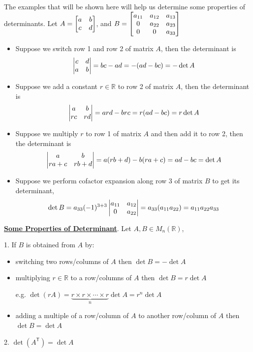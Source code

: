 \begin{example}
The examples that will be shown here will help us determine some properties of determinants. Let $\displaystyle A = \begin{bmatrix} 
a & b \\
c & d
 \end{bmatrix}$, and $\displaystyle B = \begin{bmatrix} 
a_{11} & a_{12} & a_{13} \\
0 & a_{22} & a_{23} \\
0 & 0 & a_{33}
 \end{bmatrix}$
\begin{itemize}
    \item Suppose we switch row 1 and row 2 of matrix $A$, then the determinant is
    $$\begin{vmatrix} 
    c & d \\
    a & b
     \end{vmatrix} = bc - ad = -(ad -bc) = -\det A$$
    \item Suppose we add a constant $r \in \mathbb{R}$ to row 2 of matrix $A$, then the determinant is
    $$\begin{vmatrix} 
    a & b\\
    rc & rd
     \end{vmatrix} = ard - brc = r(ad - bc) = r\det A$$
    \item Suppose we multiply $r$ to row 1 of matrix $A$ and then add it to row 2, then the determinant is
    $$\begin{vmatrix} 
    a & b\\
    ra + c & rb + d
     \end{vmatrix} = a(rb + d) - b(ra + c) = ad - bc = \det A$$
    \item Suppose we perform cofactor expansion along row 3 of matrix $B$ to get its determinant,
    $$\det B = a_{33}(-1)^{3 + 3}\begin{vmatrix} 
    a_{11} & a_{12} \\
    0 & a_{22}
     \end{vmatrix} = a_{33}(a_{11}a_{22}) = a_{11}a_{22}a_{33}$$
\end{itemize}
\end{example}

\lline

\underline{\textbf{Some Properties of Determinant}}. Let $A, B \in M_n(\mathbb{R})$,

1. If $B$ is obtained from $A$ by:
\begin{itemize}
    \item switching two rows/columns of $A$ then $\det B = -\det A$
    \item multiplying $r \in \mathbb{R}$ to a row/columns of $A$ then $\det B = r\det A$

    e.g. $\det(rA) = \underbrace{r \times r \times \cdots \times r}_{n}\det A = r^n\det A$
    \item adding a multiple of a row/column of $A$ to another row/column of $A$ then $\det B = \det A$
\end{itemize}

2. $\det(A^{\mathsf{T}}) = \det A$


